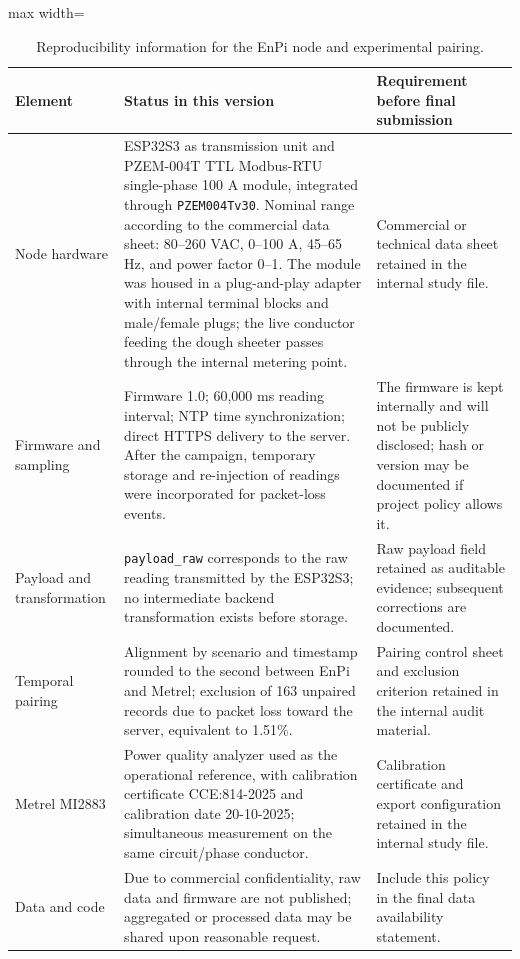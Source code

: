\documentclass{ieeeaccess}
\begin{document}
\begin{table}[t]
\caption{Reproducibility information for the EnPi node and experimental pairing.}
\label{tab:reproducibilidad-minima}
\centering
\scriptsize
\begin{adjustbox}{max width=\textwidth}
\begin{tabular}{p{}p{}p{}}
\toprule
Element & Status in this version & Requirement before final submission \\
\midrule
Node hardware & ESP32S3 as transmission unit and PZEM-004T TTL Modbus-RTU single-phase 100 A module, integrated through \texttt{PZEM004Tv30}. Nominal range according to the commercial data sheet: 80--260 VAC, 0--100 A, 45--65 Hz, and power factor 0--1. The module was housed in a plug-and-play adapter with internal terminal blocks and male/female plugs; the live conductor feeding the dough sheeter passes through the internal metering point. & Commercial or technical data sheet retained in the internal study file. \\
Firmware and sampling & Firmware 1.0; 60,000 ms reading interval; NTP time synchronization; direct HTTPS delivery to the server. After the campaign, temporary storage and re-injection of readings were incorporated for packet-loss events. & The firmware is kept internally and will not be publicly disclosed; hash or version may be documented if project policy allows it. \\
Payload and transformation & \texttt{payload\_raw} corresponds to the raw reading transmitted by the ESP32S3; no intermediate backend transformation exists before storage. & Raw payload field retained as auditable evidence; subsequent corrections are documented. \\
Temporal pairing & Alignment by scenario and timestamp rounded to the second between EnPi and Metrel; exclusion of 163 unpaired records due to packet loss toward the server, equivalent to 1.51\%. & Pairing control sheet and exclusion criterion retained in the internal audit material. \\
Metrel MI2883 & Power quality analyzer used as the operational reference, with calibration certificate CCE:814-2025 and calibration date 20-10-2025; simultaneous measurement on the same circuit/phase conductor. & Calibration certificate and export configuration retained in the internal study file. \\
Data and code & Due to commercial confidentiality, raw data and firmware are not published; aggregated or processed data may be shared upon reasonable request. & Include this policy in the final data availability statement. \\
\bottomrule
\end{tabular}
\end{adjustbox}
\end{table}
\end{document}
